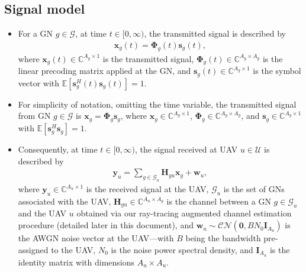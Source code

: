 \documentclass{article}
\begin{document}
\subsection{Signal model}
\begin{itemize}
    \item For a GN $g{\in}\mathcal{G}$, at time $t{\in}[0,\infty)$, the transmitted signal is described by
    \begin{align}\label{Tx_signal}
        \mathbf{x}_{g}(t){=}\boldsymbol{\Phi}_{g}(t)\mathbf{s}_{g}(t),
    \end{align}
    where $\mathbf{x}_{g}(t){\in}\mathbb{C}^{A_{g}{\times}1}$ is the transmitted signal, $\boldsymbol{\Phi}_{g}(t){\in}\mathbb{C}^{A_{g}{\times}A_{g}}$ is the linear precoding matrix applied at the GN, and $\mathbf{s}_{g}(t){\in}\mathbb{C}^{A_{g}{\times}1}$ is the symbol vector with $\mathbb{E}[\mathbf{s}_{g}^{H}(t)\mathbf{s}_{g}(t)]{=}1$.
    \item For simplicity of notation, omitting the time variable, the transmitted signal from GN $g{\in}\mathcal{G}$ is $\mathbf{x}_{g}{=}\boldsymbol{\Phi}_{g}\mathbf{s}_{g}$, where $\mathbf{x}_{g}{\in}\mathbb{C}^{A_{g}{\times}1}$, $\boldsymbol{\Phi}_{g}{\in}\mathbb{C}^{A_{g}{\times}A_{g}}$, and $\mathbf{s}_{g}{\in}\mathbb{C}^{A_{g}{\times}1}$ with $\mathbb{E}[\mathbf{s}_{g}^{H}\mathbf{s}_{g}]{=}1$.
    \item Consequently, at time $t{\in}[0,\infty)$, the signal received at UAV $u{\in}\mathcal{U}$ is described by
    \begin{align}\label{Rx_signal}
        \mathbf{y}_{u}{=}\sum_{g{\in}\mathcal{G}_{u}}\mathbf{H}_{gu}\mathbf{x}_{g}{+}\mathbf{w}_{u},
    \end{align}
    where $\mathbf{y}_{u}{\in}\mathbb{C}^{A_{u}{\times}1}$ is the received signal at the UAV, $\mathcal{G}_{u}$ is the set of GNs associated with the UAV, $\mathbf{H}_{gu}{\in}\mathbb{C}^{A_{u}{\times}A_{g}}$ is the channel between a GN $g{\in}\mathcal{G}_{u}$ and the UAV $u$ obtained via our ray-tracing augmented channel estimation procedure (detailed later in this document), and $\mathbf{w}_{u}{\sim}\mathcal{CN}\left(\mathbf{0},BN_{0}\mathbf{I}_{A_{u}}\right)$ is the AWGN noise vector at the UAV---with $B$ being the bandwidth pre-assigned to the UAV, $N_{0}$ is the noise power spectral density, and $\mathbf{I}_{A_{u}}$ is the identity matrix with dimensions $A_{u}{\times}A_{u}$.
\end{itemize}
\end{document}

